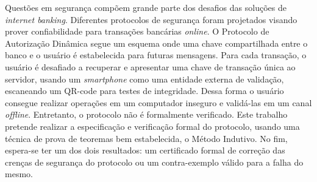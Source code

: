 Questões em segurança compõem grande parte dos desafios das soluções de \textit{internet banking}. Diferentes protocolos de segurança foram projetados visando prover confiabilidade para transações bancárias \textit{online}. O Protocolo de Autorização Dinâmica segue um esquema onde uma chave compartilhada entre o banco e o usuário é estabelecida para futuras mensagens. Para cada transação, o usuário é desafiado a recuperar e apresentar uma chave de transação única ao servidor, usando um \textit{smartphone} como uma entidade externa de validação, escaneando um QR-code para testes de integridade. Dessa forma o usuário consegue realizar operações em um computador inseguro e validá-las em um canal \textit{offline}. Entretanto, o protocolo não é formalmente verificado. Este trabalho pretende realizar a especificação e verificação formal do protocolo, usando uma técnica de prova de teoremas bem estabelecida, o Método Indutivo. No fim, espera-se ter um dos dois resultados: um certificado formal de correção das crenças de segurança do protocolo ou um contra-exemplo válido para a falha do mesmo.
